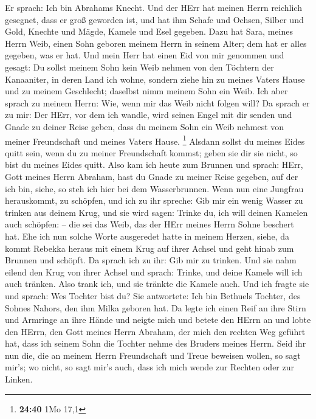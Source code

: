  Er sprach: Ich bin Abrahams Knecht.  Und
der HErr hat meinen Herrn reichlich gesegnet, dass er groß geworden ist,
und hat ihm Schafe und Ochsen, Silber und Gold, Knechte und Mägde,
Kamele und Esel gegeben.  Dazu hat Sara, meines Herrn
Weib, einen Sohn geboren meinem Herrn in seinem Alter; dem hat er alles
gegeben, was er hat.  Und mein Herr hat einen Eid von mir
genommen und gesagt: Du sollst meinem Sohn kein Weib nehmen von den
Töchtern der Kanaaniter, in deren Land ich wohne, 
sondern ziehe hin zu meines Vaters Hause und zu meinem Geschlecht;
daselbst nimm meinem Sohn ein Weib.  Ich aber sprach zu
meinem Herrn: Wie, wenn mir das Weib nicht folgen will? 
Da sprach er zu mir: Der HErr, vor dem ich wandle, wird seinen Engel mit
dir senden und Gnade zu deiner Reise geben, dass du meinem Sohn ein Weib
nehmest von meiner Freundschaft und meines Vaters Hause. \footnote{\textbf{24:40}
  1Mo 17,1}  Alsdann sollst du meines Eides quitt sein,
wenn du zu meiner Freundschaft kommst; geben sie dir sie nicht, so bist
du meines Eides quitt.  Also kam ich heute zum Brunnen
und sprach: HErr, Gott meines Herrn Abraham, hast du Gnade zu meiner
Reise gegeben, auf der ich bin,  siehe, so steh ich hier
bei dem Wasserbrunnen. Wenn nun eine Jungfrau herauskommt, zu schöpfen,
und ich zu ihr spreche: Gib mir ein wenig Wasser zu trinken aus deinem
Krug,  und sie wird sagen: Trinke du, ich will deinen
Kamelen auch schöpfen: -- die sei das Weib, das der HErr meines Herrn
Sohne beschert hat.  Ehe ich nun solche Worte ausgeredet
hatte in meinem Herzen, siehe, da kommt Rebekka heraus mit einem Krug
auf ihrer Achsel und geht hinab zum Brunnen und schöpft. Da sprach ich
zu ihr: Gib mir zu trinken.  Und sie nahm eilend den Krug
von ihrer Achsel und sprach: Trinke, und deine Kamele will ich auch
tränken. Also trank ich, und sie tränkte die Kamele auch.
 Und ich fragte sie und sprach: Wes Tochter bist du? Sie
antwortete: Ich bin Bethuels Tochter, des Sohnes Nahors, den ihm Milka
geboren hat. Da legte ich einen Reif an ihre Stirn und Armringe an ihre
Hände  und neigte mich und betete den HErrn an und lobte
den HErrn, den Gott meines Herrn Abraham, der mich den rechten Weg
geführt hat, dass ich seinem Sohn die Tochter nehme des Bruders meines
Herrn.  Seid ihr nun die, die an meinem Herrn
Freundschaft und Treue beweisen wollen, so sagt mir's; wo nicht, so sagt
mir's auch, dass ich mich wende zur Rechten oder zur Linken.

